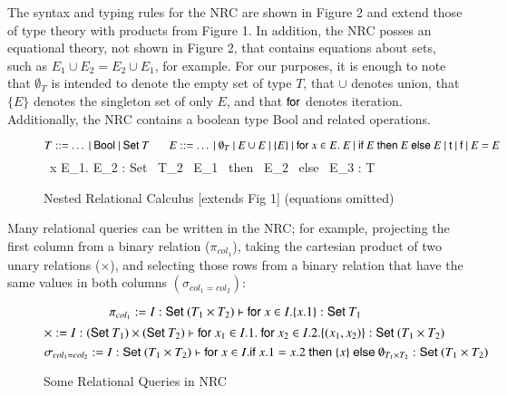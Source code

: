 \documentclass[11pt]{article}
\theoremstyle{remark}
\theoremstyle{definition}
\begin{document}
The syntax and typing rules for the NRC are shown in Figure 2 and extend those of type theory with products from Figure 1.  In addition, the NRC posses an equational theory, not shown in Figure 2, that contains equations about sets, such as $E_1 \cup E_2 = E_2 \cup E_1$, for example.  For our purposes, it is enough to note that $\emptyset_T$ is intended to denote the empty set of type $T$, that $\cup$ denotes union, that $\{ E \}$ denotes the singleton set of only $E$, and that ${\sf for}$ denotes iteration.  Additionally, the NRC contains a boolean type {\sf Bool} and related operations.

\begin{figure}[h]
\caption{Nested Relational Calculus [extends Fig 1] (equations omitted)}
$$T ::= \ldots \ | \ {\sf Bool}  \ | \ {\sf Set} \ T  \ \ \ \ \ \ \ E ::= \ldots \ | \ \emptyset_T \ | \ E \cup E \ | \ \{ E \} \ | \ {\sf for} \ x \in E. \ E \ | \ {\sf if} \ E \ {\sf then} \ E \ {\sf else} \ E \ | \ {\sf t} \ | \ {\sf f} \ | \ E = E $$
{\Gamma {} \ x \in E_1. E_2 : {\sf Set} \ T_2}
{\Gamma {} \ E_1 \ {\sf then} \ E_2 \ {\sf else} \ E_3 : T}
\end{figure}

Many relational queries can be written in the NRC; for example, projecting the first column from a binary relation ($\pi_{col_1
}$), taking the cartesian product of two unary relations ($\times$), and selecting those rows from a binary relation that have the same values in both columns $(\sigma_{col_1=col_2})$:

\begin{figure}[h]
\caption{Some Relational Queries in NRC}
$$
\pi_{col_1} := I : {\sf Set} \ (T_1 \times T_2) \vdash {\sf for} \ x \in I. \{ x.1 \} : {\sf Set} \ T_1
$$
$$\times := I : ({\sf Set} \ T_1) \times ({\sf Set} \ T_2) \vdash {\sf for} \ x_1 \in I.1. \ {\sf for} \ x_2 \in I.2. \{ (x_1, x_2) \} : {\sf Set} \ (T_1 \times T_2)
$$
$$
\sigma_{col_1=col_2} :=  I : {\sf Set} \ (T_1 \times T_2) \vdash {\sf for} \ x \in I. {\sf if} \ x.1 = x.2 \ {\sf then} \ \{ x \} \ {\sf else} \ \emptyset_{T_1 \times T_2} : {\sf Set} \ (T_1 \times T_2)
 $$
\end{figure}
\end{document}
